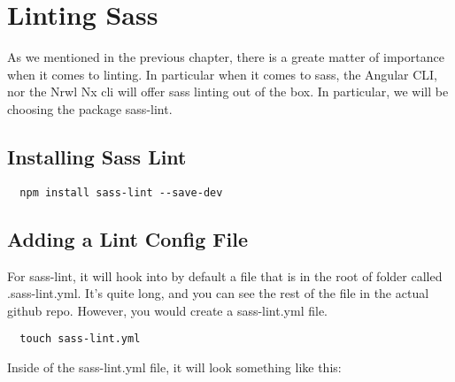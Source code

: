 \maketitle{}
\section{ Linting Sass }

As we mentioned in the previous chapter, there is a greate matter of importance
when it comes to linting. In particular when it comes to sass, the Angular CLI,
nor the Nrwl Nx cli will offer sass linting out of the box. In particular,
we will be choosing the package sass-lint.

\subsection{Installing Sass Lint}
\begin{verbatim}
  npm install sass-lint --save-dev
\end{verbatim}

\subsection{Adding a Lint Config File}
For sass-lint, it will hook into by default a file that is in the root of
folder called .sass-lint.yml. It's quite long, and you can see the rest of the
file in the actual github repo. However, you would create a sass-lint.yml file.
\begin{verbatim}
  touch sass-lint.yml
\end{verbatim}
Inside of the sass-lint.yml file, it will look something like this:
